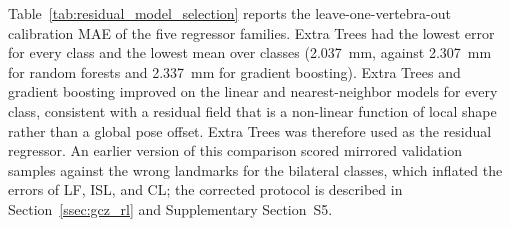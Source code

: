\documentclass[5p,times,twocolumn,authoryear]{elsarticle}
\begin{document}
Table~\ref{tab:residual_model_selection} reports the leave-one-vertebra-out calibration MAE of the five regressor families. Extra Trees had the lowest error for every class and the lowest mean over classes (2.037~mm, against 2.307~mm for random forests and 2.337~mm for gradient boosting). Extra Trees and gradient boosting improved on the linear and nearest-neighbor models for every class, consistent with a residual field that is a non-linear function of local shape rather than a global pose offset. Extra Trees was therefore used as the residual regressor. An earlier version of this comparison scored mirrored validation samples against the wrong landmarks for the bilateral classes, which inflated the errors of LF, ISL, and CL; the corrected protocol is described in Section~\ref{ssec:gcz_rl} and Supplementary Section~S5.

\begin{table}[!t]
\centering
\caption{Leave-one-vertebra-out MAE (mm) of the residual regressors on the 20 calibration vertebrae of the development analysis. For each held-out calibration vertebra, zones, class prior, and correction bound are recomputed without it, and only its original (non-mirrored) samples are scored. Best configuration and blend weight per family; lowest value per class in bold.}
\label{tab:residual_model_selection}
\renewcommand{\arraystretch}{1.10}
\scriptsize
{}
\end{table}
\end{document}
